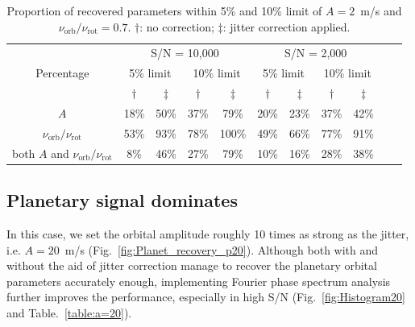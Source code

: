 \begin{table}[h!]
\centering
\begin{tabular}{|c|c|c|c|c|c|c|c|c|ll}
\cline{1-9}
\multirow{3}{*}{Percentage} & \multicolumn{4}{c|}{S/N = 10,000}                        & \multicolumn{4}{c|}{S/N = 2,000}                         &  &  \\ \cline{2-9}
                            & \multicolumn{2}{c|}{5\% limit} & \multicolumn{2}{c|}{10\% limit} & \multicolumn{2}{c|}{5\% limit} & \multicolumn{2}{c|}{10\% limit} &  &  \\ \cline{2-9}
                            				& $\dagger$     & $\ddagger$   & $\dagger$           & $\ddagger$           & $\dagger$           & $\ddagger$          & $\dagger$            & $\ddagger$          &  &  \\ \cline{1-9}
$A$                         					& 18\%            & 50\%           & 37\%            & 79\%            & 20\%            & 23\%           & 37\%             & 42\%           &  &  \\ \cline{1-9}
$\nu_\text{orb}/\nu_\text{rot}$              	& 53\%            & 93\%           & 78\%            & 100\%            & 49\%            & 66\%           & 77\%             & 91\%           &  &  \\ \cline{1-9}
both $A$ and $\nu_\text{orb}/\nu_\text{rot}$    & 8\%             & 46\%           & 27\%            & 79\%            & 10\%            & 16\%           & 28\%             & 38\%           &  &  \\ \cline{1-9}
\end{tabular}
\caption{Proportion of recovered parameters within 5\% and 10\% limit of $A = 2$~m/s and $\nu_\text{orb}/\nu_\text{rot} =0.7$. $\dagger$: no correction; $\ddagger$: jitter correction applied.}
\label{table:a=2}
\end{table}
\FloatBarrier

\subsection{Planetary signal dominates}

In this case, we set the orbital amplitude roughly 10 times as strong as the jitter, i.e. $A = 20$~m/s (Fig.~\ref{fig:Planet_recovery_p20}). Although both with and without the aid of jitter correction manage to recover the planetary orbital parameters accurately enough, implementing Fourier phase spectrum analysis further improves the performance, especially in high S/N (Fig.~\ref{fig:Histogram20} and Table.~\ref{table:a=20}). 

